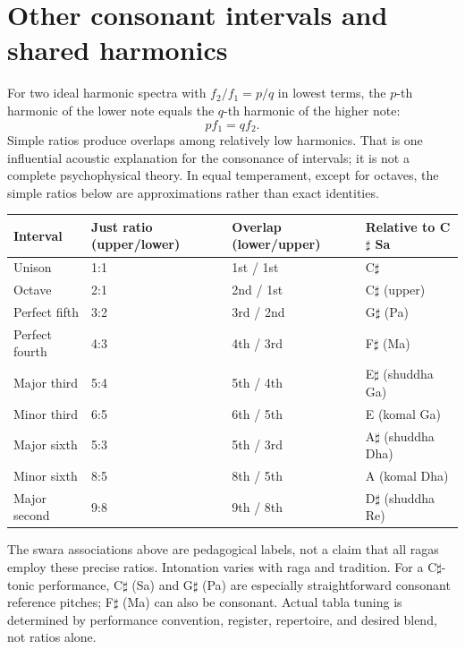 \documentclass[11pt,letterpaper]{article}
\begin{document}
\section{Other consonant intervals and shared harmonics}
For two ideal harmonic spectra with \(f_2/f_1=p/q\) in lowest terms, the \(p\)-th harmonic of the lower note equals the \(q\)-th harmonic of the higher note:
\begin{equation}pf_1=qf_2.\end{equation}
Simple ratios produce overlaps among relatively low harmonics. That is one influential acoustic explanation for the consonance of intervals; it is not a complete psychophysical theory. In equal temperament, except for octaves, the simple ratios below are approximations rather than exact identities.
\begin{center}\small\begin{tabular}{llll}\toprule
Interval & Just ratio (upper/lower) & Overlap (lower/upper) & Relative to C\(\sharp\) Sa\\\midrule
Unison & 1:1 & 1st / 1st & C\(\sharp\)\\
Octave & 2:1 & 2nd / 1st & C\(\sharp\) (upper)\\
Perfect fifth & 3:2 & 3rd / 2nd & G\(\sharp\) (Pa)\\
Perfect fourth & 4:3 & 4th / 3rd & F\(\sharp\) (Ma)\\
Major third & 5:4 & 5th / 4th & E\(\sharp\) (shuddha Ga)\\
Minor third & 6:5 & 6th / 5th & E (komal Ga)\\
Major sixth & 5:3 & 5th / 3rd & A\(\sharp\) (shuddha Dha)\\
Minor sixth & 8:5 & 8th / 5th & A (komal Dha)\\
Major second & 9:8 & 9th / 8th & D\(\sharp\) (shuddha Re)\\\bottomrule
\end{tabular}\end{center}
The swara associations above are pedagogical labels, not a claim that all ragas employ these precise ratios. Intonation varies with raga and tradition. For a C\(\sharp\)-tonic performance, C\(\sharp\) (Sa) and G\(\sharp\) (Pa) are especially straightforward consonant reference pitches; F\(\sharp\) (Ma) can also be consonant. Actual tabla tuning is determined by performance convention, register, repertoire, and desired blend, not ratios alone.
\end{document}
